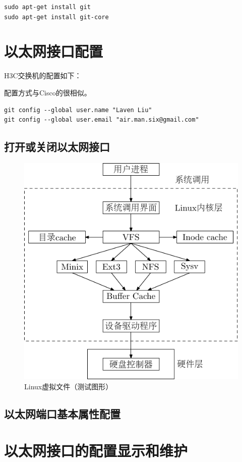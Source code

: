 \begin{verbatim}
sudo apt-get install git
sudo apt-get install git-core
\end{verbatim}

\section{以太网接口配置}

H3C交换机的配置如下：


配置方式与Cisco的很相似。

\begin{verbatim}
git config --global user.name "Laven Liu"
git config --global user.email "air.man.six@gmail.com"
\end{verbatim}

\subsection{打开或关闭以太网接口}
\label{sec:OpenShutInterface}

\begin{figure}[!htbp]
  \centering
  \includegraphics{graph/gnu-linux-0.pdf}
    \caption{Linux虚拟文件（测试图形）}
  \label{fig:LinuxVFS}
\end{figure}

\subsection{以太网端口基本属性配置}
\label{sec:BasicInterface}

\section{以太网接口的配置显示和维护}
